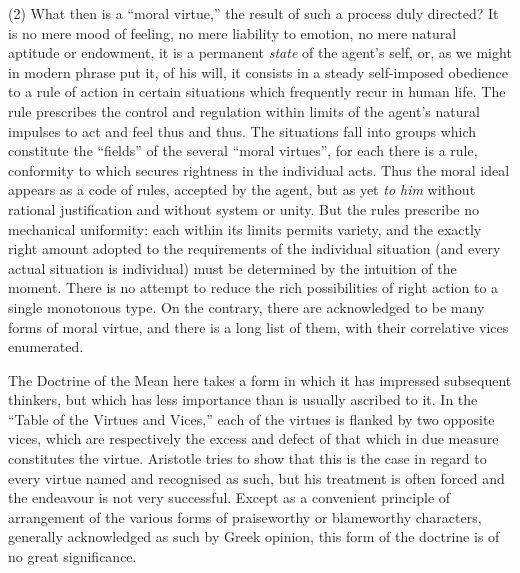 (2) What then is a “moral virtue,” the result of such a process
duly directed? It is no mere mood of feeling, no mere liability to emotion, no
mere natural aptitude or endowment, it is a permanent \emph{state} of the
agent’s self, or, as we might in modern phrase put it, of his will, it
consists in a steady self-imposed obedience to a rule of action in certain
situations which frequently recur in human life. The rule prescribes the
control and regulation within limits of the agent’s natural impulses to
act and feel thus and thus. The situations fall into groups which constitute
the “fields” of the several “moral virtues”, for each
there is a rule, conformity to which secures rightness in the individual acts.
Thus the moral ideal appears as a code of rules, accepted by the agent, but as
yet \emph{to him} without rational justification and without system or unity.
But the rules prescribe no mechanical uniformity: each within its limits
permits variety, and the exactly right amount adopted to the requirements of
the individual situation (and every actual situation is individual) must be
determined by the intuition of the moment. There is no attempt to reduce the
rich possibilities of right action to a single monotonous type. On the
contrary, there are acknowledged to be many forms of moral virtue, and there is
a long list of them, with their correlative vices enumerated.

The Doctrine of the Mean here takes a form in which it has impressed subsequent
thinkers, but which has less importance than is usually ascribed to it. In the
“Table of the Virtues and Vices,” each of the virtues is flanked by
two opposite vices, which are respectively the excess and defect of that which
in due measure constitutes the virtue. Aristotle tries to show that this is the
case in regard to every virtue named and recognised as such, but his treatment
is often forced and the endeavour is not very successful. Except as a
convenient principle of arrangement of the various forms of praiseworthy or
blameworthy characters, generally acknowledged as such by Greek opinion, this
form of the doctrine is of no great significance.


